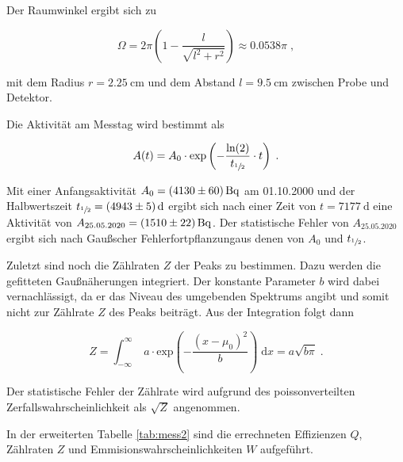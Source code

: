 Der Raumwinkel ergibt sich zu 

\begin{equation}
  \Omega = 2 \pi \left(1 - \frac{l}{\sqrt{l^2 + r^2}}\right) \approx \num{0.0538} \pi \; ,
\end{equation} 

mit dem Radius $r = \SI{2.25}{\centi\meter}$ und dem Abstand $l = \SI{9.5}{\centi\meter}$ zwischen Probe und Detektor.

Die Aktivität am Messtag wird bestimmt als

\begin{equation}
  A(t) = A_0 \cdot \text{exp} \left(- \frac{\text{ln}(2)}{t_{\sfrac{1}{2}}} \cdot t \right)  \; .
\end{equation}

Mit einer Anfangsaktivität $A_0 = \SI{4130 +- 60}{\becquerel}$ am 01.10.2000 und der Halbwertszeit
$t_{\sfrac{1}{2}} = \SI{4943 +- 5}{\day}$ ergibt sich nach einer Zeit von $t = \SI{7177}{\day}$
eine Aktivität von $A_{25.05.2020} = \SI{1510 +- 22}{\becquerel}$.
Der statistische Fehler von $A_{25.05.2020}$ ergibt sich nach 
Gaußscher Fehlerfortpflanzungaus denen von $A_0$ und $t_{\sfrac{1}{2}}$.

Zuletzt sind noch die Zählraten $Z$ der Peaks zu bestimmen. Dazu werden die gefitteten Gaußnäherungen integriert. 
Der konstante Parameter $b$ wird dabei vernachlässigt, da er das Niveau des umgebenden Spektrums angibt und somit nicht zur 
Zählrate $Z$ des Peaks beiträgt. Aus der Integration folgt dann

\begin{equation}
  Z = \int_{-\infty}^\infty \; a \cdot \text{exp}\left( - \frac{(x-\mu_0)^2}{b}\right) \; \text{d}x = a \sqrt{b\pi} \; .
  \label{eqn:rate}
\end{equation}

Der statistische Fehler der Zählrate wird aufgrund des poissonverteilten Zerfallswahrscheinlichkeit als $\sqrt{Z}$ angenommen.

In der erweiterten Tabelle \ref{tab:mess2} sind die errechneten Effizienzen $Q$, Zählraten $Z$ und 
Emmisionswahrscheinlichkeiten $W$ aufgeführt.

